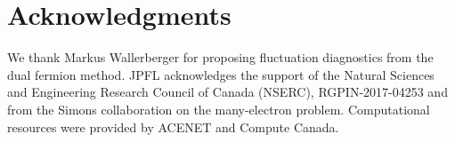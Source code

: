 \documentclass[twocolumn,notitlepage,prb,superscriptaddress,showpacs]{revtex4-1}
\begin{document}
\section{Acknowledgments}
We thank Markus Wallerberger for proposing fluctuation diagnostics from the dual fermion method.
JPFL acknowledges the support of the Natural Sciences and Engineering Research Council of Canada (NSERC), RGPIN-2017-04253 and from the Simons collaboration on the many-electron problem. 
Computational resources were provided by ACENET and Compute Canada.



\end{document}

